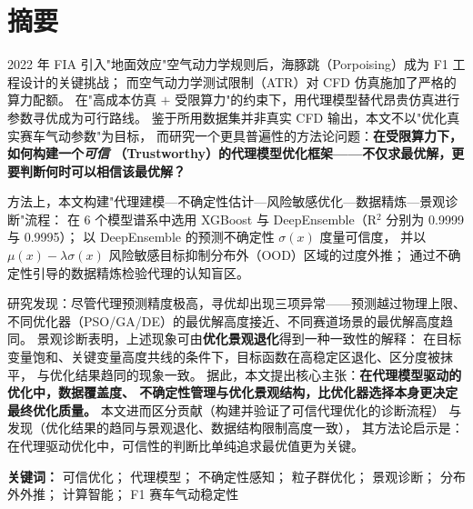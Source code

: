 \section*{摘要}

2022 年 FIA 引入"地面效应"空气动力学规则后，海豚跳（Porpoising）成为 F1 工程设计的关键挑战；
而空气动力学测试限制（ATR）对 CFD 仿真施加了严格的算力配额。
在"高成本仿真 $+$ 受限算力"的约束下，用代理模型替代昂贵仿真进行参数寻优成为可行路线。
鉴于所用数据集并非真实 CFD 输出，本文不以"优化真实赛车气动参数"为目标，
而研究一个更具普遍性的方法论问题：\textbf{在受限算力下，如何构建一个\emph{可信}
（Trustworthy）的代理模型优化框架——不仅求最优解，更要判断何时可以相信该最优解？}

方法上，本文构建"代理建模—不确定性估计—风险敏感优化—数据精炼—景观诊断"流程：
在 6 个模型谱系中选用 XGBoost 与 DeepEnsemble（R$^2$ 分别为 0.9999 与 0.9995）；
以 DeepEnsemble 的预测不确定性 $\sigma(x)$ 度量可信度，
并以 $\mu(x)-\lambda\sigma(x)$ 风险敏感目标抑制分布外（OOD）区域的过度外推；
通过不确定性引导的数据精炼检验代理的认知盲区。

研究发现：尽管代理预测精度极高，寻优却出现三项异常——预测越过物理上限、
不同优化器（PSO/GA/DE）的最优解高度接近、不同赛道场景的最优解高度趋同。
景观诊断表明，上述现象可由\textbf{优化景观退化}得到一种一致性的解释：
在目标变量饱和、关键变量高度共线的条件下，目标函数在高稳定区退化、区分度被抹平，
与优化结果趋同的现象一致。
据此，本文提出核心主张：\textbf{在代理模型驱动的优化中，数据覆盖度、
不确定性管理与优化景观结构，比优化器选择本身更决定最终优化质量。}
本文进而区分贡献（构建并验证了可信代理优化的诊断流程）
与发现（优化结果的趋同与景观退化、数据结构限制高度一致），
其方法论启示是：在代理驱动优化中，可信性的判断比单纯追求最优值更为关键。

\vspace{0.5cm}

\noindent
\textbf{关键词：}
可信优化；
代理模型；
不确定性感知；
粒子群优化；
景观诊断；
分布外外推；
计算智能；
F1 赛车气动稳定性
